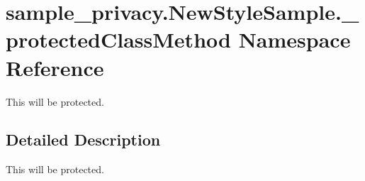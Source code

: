 \hypertarget{namespacesample__privacy_1_1_new_style_sample_1_1__protected_class_method}{\section{sample\-\_\-privacy.\-New\-Style\-Sample.\-\_\-protected\-Class\-Method Namespace Reference}
\label{namespacesample__privacy_1_1_new_style_sample_1_1__protected_class_method}
}


This will be protected.  




\subsection{Detailed Description}
This will be protected. 